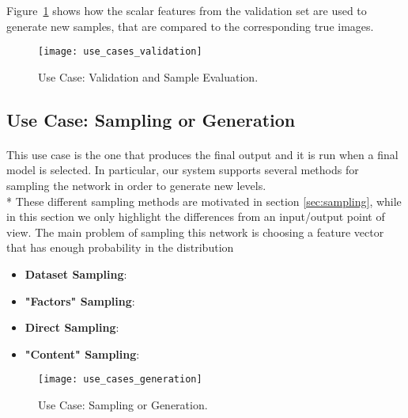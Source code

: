  Figure~\ref{fig:usecase_valid} shows how the scalar features from the validation set are used to generate new samples, that are compared to the corresponding true images.

\begin{figure}[h!]
	\begin{center}
		\texttt{[image: use\_cases\_validation]}
	\end{center}
	
	\captionsetup{width=\linewidth}
	\caption[Use Case: Validation and Sample Evaluation]{Use Case: Validation and Sample Evaluation.}
	\label{fig:usecase_valid}
\end{figure}

\subsection{Use Case: Sampling or Generation}
\label{sec:usecase_sampling}
\paragraph{} This use case is the one that produces the final output and it is run when a final model is selected. In particular, our system supports several methods for sampling the network in order to generate new levels. \\*
These different sampling methods are motivated in section \ref{sec:sampling}, while in this section we only highlight the differences from an input/output point of view.
The main problem of sampling this network is choosing a feature vector that has enough probability in the distribution 
\begin{itemize}
	\item \textbf{Dataset Sampling}:
	\item \textbf{"Factors" Sampling}:
	\item \textbf{Direct Sampling}:
	\item \textbf{"Content" Sampling}:
	
	
\end{itemize}


\begin{figure}[h!]
	\begin{center}
		\texttt{[image: use\_cases\_generation]}
	\end{center}
	
	\captionsetup{width=\linewidth}
	\caption[Use Case: Sampling or Generation]{Use Case: Sampling or Generation.}
	\label{fig:usecase_sampling}
\end{figure}




